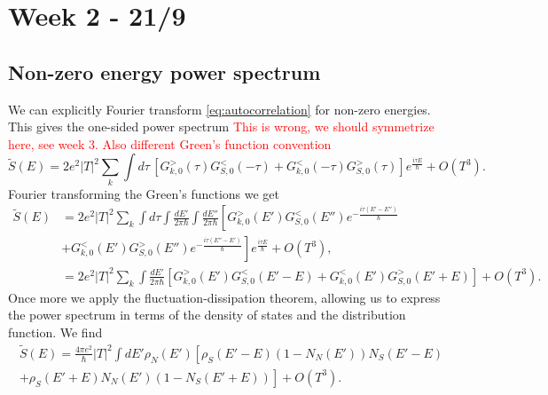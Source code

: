 \section{Week 2 - 21/9}
\subsection{Non-zero energy power spectrum}
We can explicitly Fourier transform \autoref{eq:autocorrelation} for non-zero energies. This gives the one-sided power spectrum \textcolor{red}{This is wrong, we should symmetrize here, see week 3. Also different Green's function convention}
\begin{equation}
    \tilde{S}(E) = 2e^2|T|^2 \sum_k \int d\tau \,\left[G^>_{k,0}(\tau)G^<_{S,0}(-\tau) + G^<_{k,0}(-\tau)G^>_{S,0}(\tau)\right]e^{\frac{i\tau E}{\hbar}} + O(T^3).
\end{equation}
Fourier transforming the Green's functions we get
\begin{align}
    \tilde{S}(E) &= 2e^2|T|^2 \sum_k \int d\tau \int \frac{dE'}{2\pi\hbar} \int\frac{dE''}{2\pi\hbar} \left[G^>_{k,0}(E')G^<_{S,0}(E'')e^{-\frac{i\tau(E'-E'')}{\hbar}} \right. \nonumber \\ 
    &\left.+ G^<_{k,0}(E')G^>_{S,0}(E'')e^{-\frac{i\tau(E''-E')}{\hbar}}\right]e^{\frac{i\tau E}{\hbar}} + O(T^3), \nonumber\\
    &=2e^2|T|^2 \sum_k \int \frac{dE'}{2\pi\hbar}\left[G^>_{k,0}(E')G^<_{S,0}(E'-E) + G^<_{k,0}(E')G^>_{S,0}(E'+E)\right] + O(T^3).
\end{align}
Once more we apply the fluctuation-dissipation theorem, allowing us to express the power spectrum in terms of the density of states and the distribution function. We find 
\begin{align}
    \tilde{S}(E) = \frac{4\pi e^2}{\hbar}|T|^2 \int dE' \rho_N(E')\left[\rho_S(E'-E)(1-N_N(E'))N_S(E'-E)\right.\nonumber\\
    \left.+\rho_S(E'+E)N_N(E')(1-N_S(E'+E))\right] + O(T^3).
\end{align}

